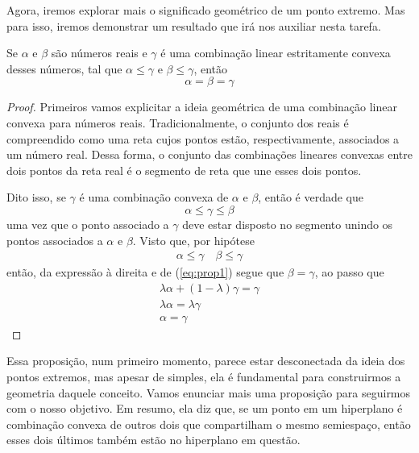 Agora, iremos explorar mais o significado geométrico de um ponto extremo. Mas para isso, iremos demonstrar um resultado que irá nos auxiliar nesta tarefa.

\begin{prop:combinação convexa}
	\label{prop:combinação convexa}
	Se $\alpha$ e $\beta$ são números reais e $\gamma$ é uma combinação linear estritamente convexa desses números, tal que $\alpha \leq \gamma$ e $\beta \leq \gamma$, então \[\alpha = \beta = \gamma\]
	
	\begin{proof}
		Primeiros vamos explicitar a ideia geométrica de uma combinação linear convexa para números reais. Tradicionalmente, o conjunto dos reais é compreendido como uma reta cujos pontos estão, respectivamente, associados a um número real. Dessa forma, o conjunto das combinações lineares convexas entre dois pontos da reta real é o segmento de reta que une esses dois pontos.
		
		Dito isso, se $\gamma$ é uma combinação convexa de $\alpha$ e $\beta$, então é verdade que
		\begin{equation}
			\label{eq:prop1}
			\alpha \leq \gamma \leq \beta
		\end{equation}uma vez que o ponto associado a $\gamma$ deve estar disposto no segmento unindo os pontos associados a $\alpha$ e $\beta$.	Visto que, por hipótese
		\begin{align*}
			\alpha \leq \gamma \quad \beta \leq \gamma
		\end{align*}
		então, da expressão à direita e de (\ref{eq:prop1}) segue que $\beta = \gamma$, ao passo que
		\begin{gather*}
			\lambda \alpha + (1 - \lambda) \gamma = \gamma \\
			\lambda \alpha = \lambda \gamma \\
			\alpha = \gamma
		\end{gather*}
	\end{proof}
\end{prop:combinação convexa}

Essa proposição, num primeiro momento, parece estar desconectada da ideia dos pontos extremos, mas apesar de simples, ela é fundamental para construirmos a geometria daquele conceito. Vamos enunciar mais uma proposição para seguirmos com o nosso objetivo. Em resumo, ela diz que, se um ponto em um hiperplano é combinação convexa de outros dois que compartilham o mesmo semiespaço, então esses dois últimos também estão no hiperplano em questão.

